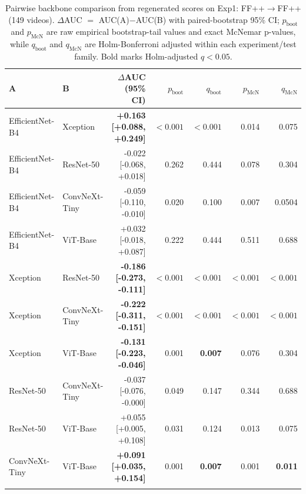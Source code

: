 \begin{table}[!htbp]
\caption{Pairwise backbone comparison from regenerated scores on Exp1: FF++$\to$FF++ (149 videos). $\Delta$AUC $=$ AUC(A)$-$AUC(B) with paired-bootstrap 95\% CI; $p_{\mathrm{boot}}$ and $p_{\mathrm{McN}}$ are raw empirical bootstrap-tail values and exact McNemar p-values, while $q_{\mathrm{boot}}$ and $q_{\mathrm{McN}}$ are Holm-Bonferroni adjusted within each experiment/test family. Bold marks Holm-adjusted $q<0.05$.}
\centering
\small
\setlength{\tabcolsep}{3pt}
\begin{tabular}{l l r r r r r}
\toprule
\textbf{A} & \textbf{B} & \textbf{$\Delta$AUC (95\% CI)} & \textbf{$p_{\mathrm{boot}}$} & \textbf{$q_{\mathrm{boot}}$} & \textbf{$p_{\mathrm{McN}}$} & \textbf{$q_{\mathrm{McN}}$} \\
\midrule
EfficientNet-B4 & Xception & \textbf{+0.163 [+0.088, +0.249]} & $<0.001$ & \textbf{$<0.001$} & 0.014 & 0.075 \\
EfficientNet-B4 & ResNet-50 & -0.022 [-0.068, +0.018] & 0.262 & 0.444 & 0.078 & 0.304 \\
EfficientNet-B4 & ConvNeXt-Tiny & -0.059 [-0.110, -0.010] & 0.020 & 0.100 & 0.007 & 0.0504 \\
EfficientNet-B4 & ViT-Base & +0.032 [-0.018, +0.087] & 0.222 & 0.444 & 0.511 & 0.688 \\
Xception & ResNet-50 & \textbf{-0.186 [-0.273, -0.111]} & $<0.001$ & \textbf{$<0.001$} & $<0.001$ & \textbf{$<0.001$} \\
Xception & ConvNeXt-Tiny & \textbf{-0.222 [-0.311, -0.151]} & $<0.001$ & \textbf{$<0.001$} & $<0.001$ & \textbf{$<0.001$} \\
Xception & ViT-Base & \textbf{-0.131 [-0.223, -0.046]} & 0.001 & \textbf{0.007} & 0.076 & 0.304 \\
ResNet-50 & ConvNeXt-Tiny & -0.037 [-0.076, -0.000] & 0.049 & 0.147 & 0.344 & 0.688 \\
ResNet-50 & ViT-Base & +0.055 [+0.005, +0.108] & 0.031 & 0.124 & 0.013 & 0.075 \\
ConvNeXt-Tiny & ViT-Base & \textbf{+0.091 [+0.035, +0.154]} & 0.001 & \textbf{0.007} & 0.001 & \textbf{0.011} \\
\botrule
\end{tabular}
\label{tab:sig_exp1}
\end{table}

\vspace{0.8em}

